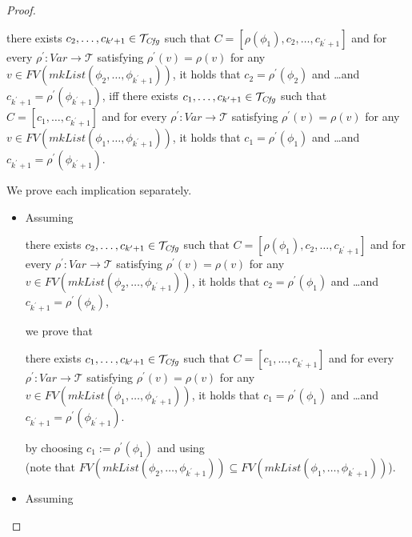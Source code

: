 \begin{proof}
\begin{itemize}
    \begin{proofenv}
    there exists $c_2, \ldots, c_{k^\prime + 1} \in \mathcal{T}_{\mathit{Cfg}}$ such that
    $C = [\rho(\phi_1), c_2, \ldots, c_{k^\prime+1}]$
    and for every $\rho^\prime : \mathit{Var} \to \mathcal{T}$ satisfying
    $\rho^\prime(v) = \rho(v)$ for any
    $v \in \mathit{FV}(\mathit{mkList}(\phi_2, \ldots, \phi_{k^\prime+1}))$,
    it holds that
    $c_2 = \rho^\prime(\phi_2)$ and \ldots and $c_{k^\prime+1} = \rho^\prime(\phi_{k^\prime+1})$,
    iff there exists $c_1, \ldots, c_{k^\prime + 1} \in \mathcal{T}_{\mathit{Cfg}}$ such that $C = [c_1, \ldots, c_{k^\prime + 1}]$
    and for every $\rho^\prime : \mathit{Var} \to \mathcal{T}$ satisfying
    $\rho^\prime(v) = \rho(v)$ for any
    $v \in \mathit{FV}(\mathit{mkList}(\phi_1, \ldots, \phi_{k^\prime + 1}))$,
    it holds that
    $c_1 = \rho^\prime(\phi_1)$ and \ldots and $c_{k^\prime + 1} = \rho^\prime(\phi_{k^\prime + 1})$.
    \end{proofenv}
    We prove each implication separately.
    \begin{itemize}
        \item Assuming
        \begin{proofenv}
        there exists $c_2, \ldots, c_{k^\prime + 1} \in \mathcal{T}_{\mathit{Cfg}}$ such that
        $C = [\rho(\phi_1), c_2, \ldots, c_{k^\prime+1}]$
        and for every $\rho^\prime : \mathit{Var} \to \mathcal{T}$ satisfying
        $\rho^\prime(v) = \rho(v)$ for any
        $v \in \mathit{FV}(\mathit{mkList}(\phi_2, \ldots, \phi_{k^\prime+1}))$,
        it holds that
        $c_2 = \rho^\prime(\phi_1)$ and \ldots and $c_{k^\prime+1} = \rho^\prime(\phi_k)$,
        \end{proofenv}
        we prove that
        \begin{proofenv}
        there exists $c_1, \ldots, c_{k^\prime + 1} \in \mathcal{T}_{\mathit{Cfg}}$ such that $C = [c_1, \ldots, c_{k^\prime + 1}]$
        and for every $\rho^\prime : \mathit{Var} \to \mathcal{T}$ satisfying
        $\rho^\prime(v) = \rho(v)$ for any
        $v \in \mathit{FV}(\mathit{mkList}(\phi_1, \ldots, \phi_{k^\prime + 1}))$,
        it holds that
        $c_1 = \rho^\prime(\phi_1)$ and \ldots and $c_{k^\prime + 1} = \rho^\prime(\phi_{k^\prime + 1})$.
        \end{proofenv}
        by choosing $c_1 := \rho^\prime(\phi_1)$ and using \\
        (note that $\mathit{FV}(\mathit{mkList}(\phi_2,\ldots,\phi_{k^\prime+1})) \subseteq \mathit{FV}(\mathit{mkList}(\phi_1,\ldots,\phi_{k^\prime+1}))$).
        \item Assuming

\end{itemize}
\end{itemize}
\end{proof}
